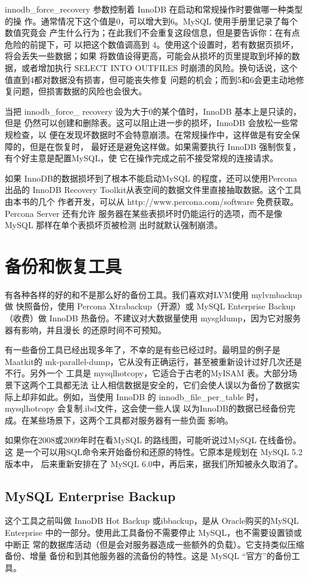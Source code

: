 innodb\_force\_recovery 参数控制着 InnoDB 在启动和常规操作时要做哪一种类型的操
作。通常情况下这个值是0，可以增大到6。MySQL 使用手册里记录了每个数值究竟会
产生什么行为；在此我们不会重复这段信息，但是要告诉你：在有点危险的前提下，可
以把这个数值调高到 4。使用这个设置时，若有数据页损坏，将会丢失一些数据；如果
将数值设得更高，可能会从损坏的页里提取到坏掉的数据，或者增加执行 SELECT INTO
OUTFILES 时崩溃的风险。换句话说，这个值直到4都对数据没有损害，但可能丧失修复
问题的机会；而到5和6会更主动地修复问题，但损害数据的风险也会很大。

当把 innodb\_force\_ recovery 设为大于0的某个值时，InnoDB 基本上是只读的，但是
仍然可以创建和删除表。这可以阻止进一步的损坏，InnoDB 会放松一些常规检查，以
便在发现坏数据时不会特意崩溃。在常规操作中，这样做是有安全保障的，但是在恢复时，
最好还是避免这样做。如果需要执行 InnoDB 强制恢复，有个好主意是配置MySQL，使
它在操作完成之前不接受常规的连接请求。

如果 InnoDB的数据损坏到了根本不能启动MySQL 的程度，还可以使用Percona 出品的
InnoDB Recovery Toolkit从表空间的数据文件里直接抽取数据。这个工具由本书的几个
作者开发，可以从 http://www.percona.com/software 免费获取。Percona Server 还有允许
服务器在某些表损坏时仍能运行的选项，而不是像 MySQL 那样在单个表损坏页被检测
出时就默认强制崩溃。

\section{备份和恢复工具}
有各种各样的好的和不是那么好的备份工具。我们喜欢对LVM使用 mylvmbackup 做
快照备份，使用 Percona Xtrabackup（开源）或 MySQL Enterprise Backup（收费）做
InnoDB 热备份。不建议对大数据量使用 mysgldump，因为它对服务器有影响，并且漫长
的还原时间不可预知。

有一些备份工具已经出现多年了，不幸的是有些已经过时。最明显的例子是Maatkit的
mk-parallel-dump，它从没有正确运行，甚至被重新设计过好几次还是不行。另外一个
工具是 mysqlhotcopy，它适合于古老的MyISAM 表。大部分场景下这两个工具都无法
让人相信数据是安全的，它们会使人误以为备份了数据实际上却非如此。例如，当使用
InnoDB 的 innodb\_file\_per\_table 时，mysqlhotcopy 会复制.ibd文件，这会使一些人误
以为InnoDB的数据已经备份完成。在某些场景下，这两个工具都对服务器有一些负面
影响。

如果你在2008或2009年时在看MySQL 的路线图，可能听说过MySQL 在线备份。这
是一个可以用SQL命令来开始备份和还原的特性。它原本是规划在 MySQL 5.2版本中，
后来重新安排在了 MySQL 6.0中，再后来，据我们所知被永久取消了。

\subsection{MySQL Enterprise Backup}
这个工具之前叫做 InnoDB Hot Backup 或ibbackup，是从 Oracle购买的MySQL
Enterprise 中的一部分。使用此工具备份不需要停止 MySQL，也不需要设置锁或中断正
常的数据库活动（但是会对服务器造成一些额外的负载）。它支持类似压缩备份、增量
备份和到其他服务器的流备份的特性。这是 MySQL “官方”的备份工具。

